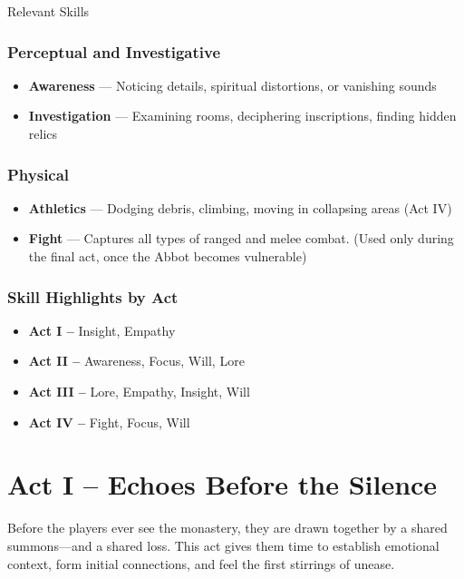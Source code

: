 \documentclass[nodeprecatedcode,bg=print]{dndbook/dndbook}
\begin{document}
\begin{WyrdSidebar}{Relevant Skills}
    \subsubsection{Perceptual and Investigative}
    \begin{itemize}
        \item \textbf{Awareness} — Noticing details, spiritual distortions, or vanishing sounds
        \item \textbf{Investigation} — Examining rooms, deciphering inscriptions, finding hidden relics
    \end{itemize}
    
    \subsubsection{Physical}
    \begin{itemize}
        \item \textbf{Athletics} — Dodging debris, climbing, moving in collapsing areas (Act IV)
        \item \textbf{Fight} — Captures all types of ranged and melee combat. (Used only during the final act, once the Abbot becomes vulnerable)
    \end{itemize}
    
    \subsubsection{Skill Highlights by Act}
    \begin{itemize}
        \item \textbf{Act I –} Insight, Empathy
        \item \textbf{Act II –} Awareness, Focus, Will, Lore
        \item \textbf{Act III –} Lore, Empathy, Insight, Will
        \item \textbf{Act IV –} Fight, Focus, Will
    \end{itemize}
    
\end{WyrdSidebar}
    

\section*{Act I – Echoes Before the Silence}

Before the players ever see the monastery, they are drawn together by a shared summons—and a shared loss. This act gives them time to establish emotional context, form initial connections, and feel the first stirrings of unease.
\end{document}
